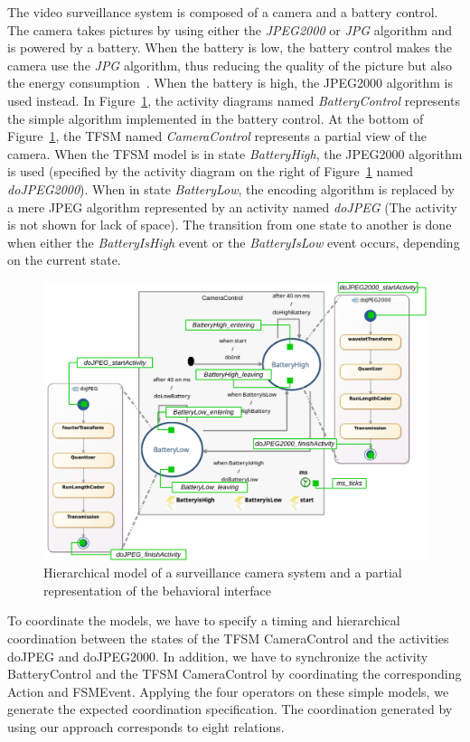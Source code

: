 	The video surveillance system is composed of a camera and a battery control. The camera takes pictures by using either the \emph{JPEG2000} or \emph{JPG} algorithm and is powered by a battery. When the battery is low, the battery control makes the camera use the \emph{JPG} algorithm, thus reducing the quality of the picture but also the energy consumption~\cite{encodingcomparison}. When the battery is high, the JPEG2000 algorithm is used instead. In Figure~\ref{fig:camerasystem}, the activity diagrams named \emph{BatteryControl} represents the simple algorithm implemented in the battery control. At the bottom of Figure~\ref{fig:camerasystem}, the TFSM named \emph{CameraControl} represents a partial view of the camera. When the TFSM model is in state \emph{BatteryHigh}, the JPEG2000 algorithm is used (specified by the activity diagram on the right of Figure~\ref{fig:camerasystem} named \emph{doJPEG2000}). When in state \emph{BatteryLow}, the encoding algorithm is replaced by a mere JPEG algorithm represented by an activity named \emph{doJPEG} (The activity is not shown for lack of space). The transition from one state to another is done when either the \emph{BatteryIsHigh} event or the \emph{BatteryIsLow} event occurs, depending on the current state.	 
	
	\begin{figure}
		\center
		\includegraphics[width=.7\columnwidth]{examples/figs/picmodels.pdf}
		\caption{Hierarchical model of a surveillance camera system and a partial representation of the behavioral interface}
		\label{fig:camerasystem}
	\end{figure}
	
	To coordinate the models, we have to specify a timing and hierarchical coordination between the states of the TFSM CameraControl and the activities doJPEG and doJPEG2000. In addition, we have to synchronize the activity BatteryControl and the TFSM CameraControl by coordinating the corresponding Action and FSMEvent. Applying the four operators on these simple models, we generate the expected coordination specification. The coordination generated by using our approach corresponds to eight \ccsl relations.
	 
